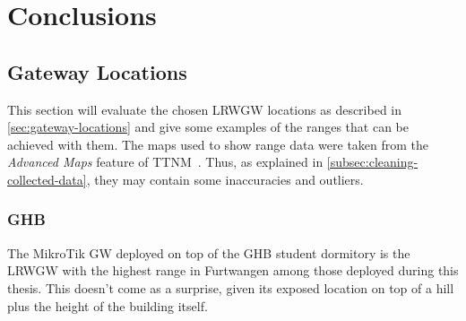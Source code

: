 \chapter{Conclusions}

\section{Gateway Locations}\label{sec:gateway-locations-conclusions}

This section will evaluate the chosen \acl{LRWGW} locations as described in \cref{sec:gateway-locations} and give some examples of the ranges that can be achieved with them.
The maps used to show range data were taken from the \emph{Advanced Maps} feature of \ac{TTNM}~\cite{ttn_mapper_ttn_2023-1}.
Thus, as explained in \cref{subsec:cleaning-collected-data}, they may contain some inaccuracies and outliers.

\subsection{\acl{GHB}}\label{subsec:ghb-student-dormitory-range-results}

The MikroTik \acl{GW} deployed on top of the \ac{GHB} student dormitory is the \acl{LRWGW} with the highest range in Furtwangen among those deployed during this thesis.
This doesn't come as a surprise, given its exposed location on top of a hill plus the height of the building itself.

